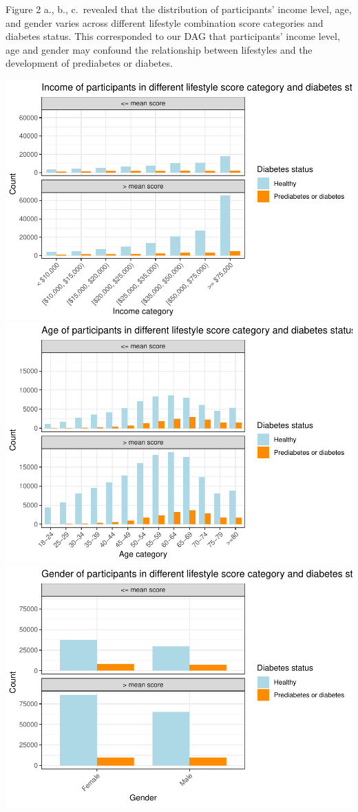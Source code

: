 \documentclass[
  12pt,
]{article}
\begin{document}
Figure 2 a., b., c.~revealed that the distribution of participants'
income level, age, and gender varies across different lifestyle
combination score categories and diabetes status. This corresponded to
our DAG that participants' income level, age and gender may confound the
relationship between lifestyles and the development of prediabetes or
diabetes.

\includegraphics{template_files/figure-latex/unnamed-chunk-4-1.pdf}
\includegraphics{template_files/figure-latex/unnamed-chunk-4-2.pdf}
\includegraphics{template_files/figure-latex/unnamed-chunk-4-3.pdf}
\end{document}
